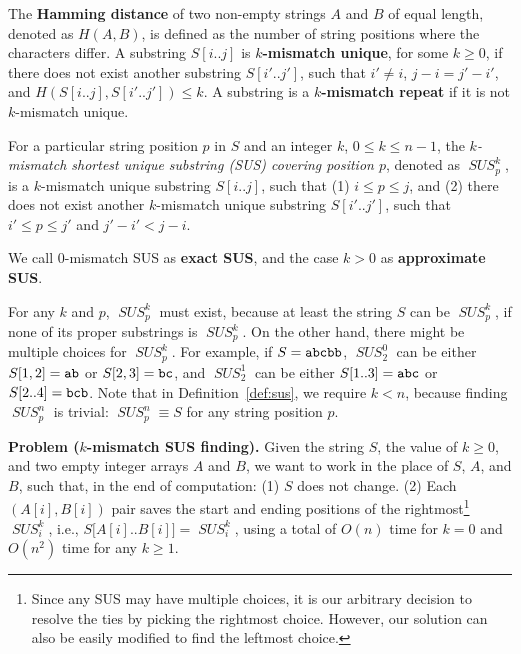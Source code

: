 \documentclass[11pt]{llncs}
\DeclareMathOperator{\sus}{\mathit{SUS}}
\begin{document}
The {\bf Hamming distance} of two non-empty strings $A$ and $B$ of
equal length, denoted as $H(A,B)$, is defined as the number of string
positions where the characters differ.  A substring $S[i .. j]$
is {\bf $k$-mismatch unique}, for some $k\geq 0$, if there does
not exist another substring $S[i'.. j']$, such that $i'\neq i$,
$j-i = j'-i'$, and $H(S[i..j],S[i'..j'])\leq k$.  A substring is a
{\bf $k$-mismatch repeat} if it is not $k$-mismatch unique.


\begin{definition}
\label{def:sus}
For a particular string position $p$ in $S$ and an integer $k$, $0\leq
k \leq n-1$, the \emph{$k$-mismatch shortest unique substring (SUS)
  covering position $p$}, denoted as $\sus_p^k$, is a $k$-mismatch
unique substring $S[i..j]$, such that (1) $i\leq p \leq j$, and (2) there
does not exist another $k$-mismatch unique substring $S[i'..j']$, such
that $i'\leq p \leq j'$ and $j'-i' < j-i$.
\end{definition}

We call $0$-mismatch SUS as {\bf exact SUS},
and the case $k>0$ as {\bf approximate SUS}.

For any $k$ and $p$, $\sus_p^k$ must exist, because at least the
string $S$ can be $\sus_p^k$, if none of its proper substrings is
$\sus_p^k$.  On the other hand, there might be multiple choices for
$\sus_p^k$.  For example, if $S={\tt abcbb}$, $\sus_2^0$ can be
either $S[1,2]={\tt ab}$ or $S[2,3]={\tt bc}$, and $\sus_2^1$ can be
either $S[1..3]={\tt abc}$ or $S[2..4]={\tt bcb}$.
Note that in Definition~\ref{def:sus}, we require $k < n$, because
finding $\sus_p^n$ is trivial: $\sus_p^n\equiv S$ for any string
position $p$.



\bigskip  

\noindent
{\bf Problem ($k$-mismatch SUS finding).}
Given the string $S$, the value of $k\geq 0$, and two empty integer arrays
$A$ and $B$, we want to work in the place of $S$, $A$, and $B$, such
that, in the end of computation: (1) $S$ does not change. (2) Each
$(A[i],B[i])$ pair saves the start and ending positions of the
rightmost\footnote{Since any SUS may have multiple choices, it is our
  arbitrary decision to resolve the ties by picking the rightmost
  choice. However, our solution can also be easily modified to find
  the leftmost choice.}  $\sus_i^k$, i.e., 
$S\bigl[A[i].. B[i]\bigr] = \sus_i^k$,
 using a total of $O(n)$ time for
$k=0$ and $O(n^2)$ time for any $k\geq 1$.
\end{document}

